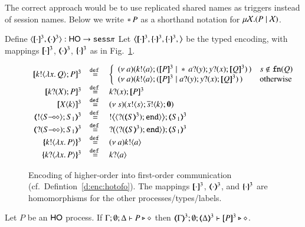 The correct approach would be to use replicated shared names
as triggers instead of session names. 
Below we write $\ast\,{} P$ as a shorthand notation for $\mu \mathcal{X}. (P \;|\; \mathcal{X})$.

\begin{definition}\label{d:enc:hotofo}
	Define $\encod{\cdot}{\cdot}{3}: \HO \to \sessp$ 
	Let $\enco{\map{\cdot}^3, \mapa{\cdot}^3, \mapa{\cdot}^3,}$ be the typed encoding, with mappings 
	$[\!\![\cdot]\!\!]^{3}$, $(\!\!\langle\cdot\rangle\!\!)^{3}$, $\{\!\!\{\cdot\}\!\!\}^{3}$ as
	in Fig.~\ref{f:enc:hotofo}.
	\begin{figure}[t]
	\[
	\begin{array}{rcl}
		\pmap{\bout{k}{\abs{x}{Q}} P}{3} & \defeq &  \left\{
		\begin{array}{ll}
			\newsp{a}{\bout{k}{a} (\pmap{P}{3} \Par \repl{} \binp{a}{y} \binp{y}{x} \pmap{Q}{3})\,} & s \notin \fn{Q} \\
			\newsp{a}{\bout{k}{a} (\pmap{P}{3} \Par \binp{a}{y} \binp{y}{x} \pmap{Q}{3})\,} & \textrm{otherwise} %
		\end{array}
		\right.
		\\
		\pmap{\binp{k}{X} P}{3} &\defeq&  \binp{k}{x} \pmap{P}{3}\\
		\pmap{\appl{X}{k}}{3} & \defeq & \newsp{s}{\bout{x}{s} \bout{\dual{s}}{k} \inact}\\
		\tmap{\btout{\lhot{S}}S_1}{3} & \defeq & \bbtout{\chtype{\btinp{\tmap{S}{3}}\tinact}}\tmap{S_1}{3} \\
		\tmap{\btinp{\lhot{S}}S_1}{3} & \defeq & \bbtinp{\chtype{\btinp{\tmap{S}{3}}\tinact}}\tmap{S_1}{3} \\
		\mapa{\bactout{k}{\abs{ x}{P}} }^3 &  \defeq & \news{a} \bactout{k}{a} \\
		\mapa{\bactinp{k}{\abs{ x}{P}} }^3 &  \defeq & \bactinp{k}{a}
	\end{array}
	\]
	\caption{
Encoding of higher-order  into first-order communication (cf.~Defintion~\ref{d:enc:hotofo}).
\label{f:enc:hotofo}
The mappings 
$[\!\![\cdot]\!\!]^3$,
$(\!\!\langle\cdot\rangle\!\!)^3$, 
and 
$\{\!\!\{\cdot\}\!\!\}^3$
are homomorphisms for the other processes/types/labels. 
}
\end{figure}
\end{definition}

\begin{proposition}
Let $P$ be an  $\mathsf{HO}$ process. 
If			$\Gamma; \emptyset; \Delta \vdash P \triangleright \diamond$ then 
			$\mapt{\Gamma}^{3}; \emptyset; \mapt{\Delta}^{3} \proves \map{P}^{3} \hastype \Proc$. 
\end{proposition}

